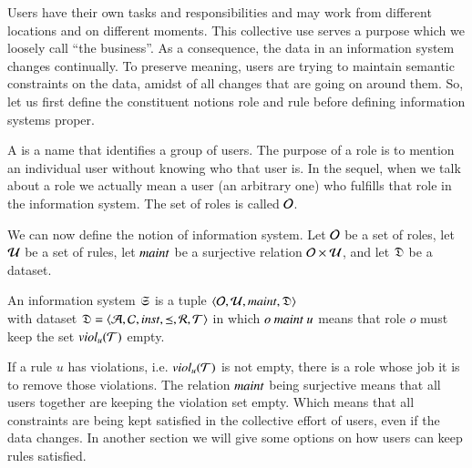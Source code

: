 \documentclass{elsarticle}
\begin{document}
	Users have their own tasks and responsibilities
	and may work from different locations and on different moments.
	This collective use serves a purpose which we loosely call ``the business''.
	As a consequence, the data in an information system changes continually.
	To preserve meaning, users are trying to maintain semantic constraints on the data,
	amidst of all changes that are going on around them.
	So, let us first define the constituent notions role and rule before defining information systems proper.

	A  is a name that identifies a group of users.
	The purpose of a role is to mention an individual user without knowing who that user is.
	In the sequel, when we talk about a role we actually mean a user (an arbitrary one) who fulfills that role in the information system.
	The set of roles is called $\mathcal{O}$.

	We can now define the notion of information system.
	Let $\mathcal{O}$ be a set of roles,
	let $\mathcal{U}$ be a set of rules, 
	let $\text{\it maint\/}$ be a surjective relation $\mathcal{O}\times\mathcal{U}$,
	and let $\mathfrak{D}$ be a dataset.
\begin{definition}
	\label{def:information system}
	\item An information system $\mathfrak{S}$ is a tuple $\langle\mathcal{O},\mathcal{U},\text{\it maint\/},\mathfrak{D}\rangle$\\
	with dataset $\mathfrak{D}=\langle\mathcal{A},\mathcal{C},\text{\it inst\/},\preceq,\mathcal{R},\mathcal{T}\rangle$
	in which $o\ \text{\it maint\/}\ u$ means that role $o$ must keep the set $\text{\it viol\/}_{u}(\mathcal{T})$ empty.
\end{definition}
	If a rule $u$ has violations, i.e. $\text{\it viol\/}_{u}(\mathcal{T})$ is not empty, there is a role whose job it is to remove those violations.
	The relation $\text{\it maint\/}$ being surjective means that all users together are keeping the violation set empty.
	Which means that all constraints are being kept satisfied in the collective effort of users, even if the data changes.
	In another section we will give some options on how users can keep rules satisfied.
\end{document}
